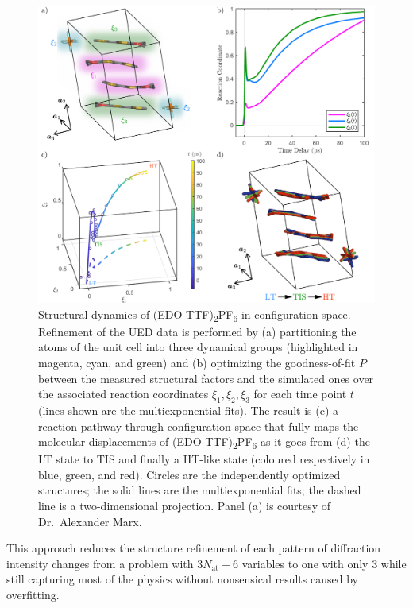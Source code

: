 \begin{figure}[ht!]
  \centering
  \includegraphics[width = \textwidth]{Figures/fig_EDO_movie.pdf}
  \caption[Structural dynamics of (EDO-TTF)\textsubscript{2}PF\textsubscript{6} in configuration space.]{
  Structural dynamics of (EDO-TTF)\textsubscript{2}PF\textsubscript{6} in configuration space.
  Refinement of the UED data is performed by
  (a) partitioning the atoms of the unit cell into three dynamical groups (highlighted in magenta, cyan, and green) and
  (b) optimizing the goodness-of-fit $P$ between the measured structural factors and the simulated ones
  over the associated reaction coordinates $\xi_1, \xi_2, \xi_3$ for each time point $t$
  (lines shown are the multiexponential fits).
  The result is (c) a reaction pathway through configuration space that fully maps
  the molecular displacements of (EDO-TTF)\textsubscript{2}PF\textsubscript{6}
  as it goes from (d) the LT state to TIS and finally a HT-like state
  (coloured respectively in blue, green, and red).
  Circles are the independently optimized structures;
  the solid lines are the multiexponential fits; the dashed line is a two-dimensional projection.
  Panel (a) is courtesy of Dr.~Alexander Marx.
  }
  \label{fig: EDO-movie}
\end{figure}
%
This approach reduces the structure refinement of each pattern of diffraction intensity changes
from a problem with $3N_\text{at} - 6$ variables to one with only $3$
while still capturing most of the physics without nonsensical results caused by overfitting.

